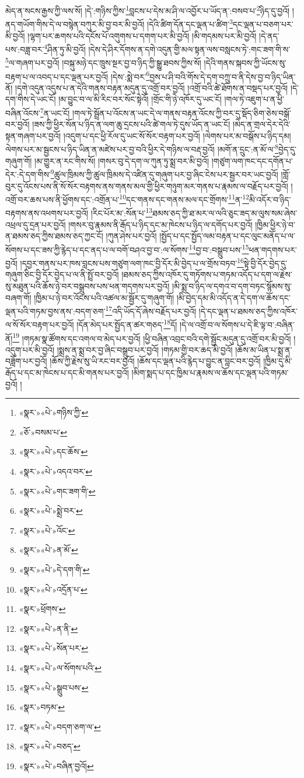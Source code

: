 མེད་ན་སངས་རྒྱས་ཀྱི་ལས་སོ། །དེ་:གཉིས་ཀྱིས་\footnote{«སྣར་»«པེ་»གཉིས་ཀྱི་}བླངས་པ་དེས་མ་ཤི་ལ་འབྱོར་པ་ཡོད་ན་:བསབ་པ་\footnote{«ཅོ་»བསམ་པ་}ཉིད་དུ་བྱའོ། །ནད་གཡོག་གིས་དེ་ལ་བསྙེན་བཀུར་མི་བྱ་བར་མི་བྱའོ། །དེའི་ཚིག་དོན་དང་ལྡན་པ་ཚིག་\footnote{«སྣར་»«པེ་»དང་ཆོས་}དང་ལྡན་པ་བཅག་པར་མི་བྱའོ། །ལྷག་པར་ཆགས་པའི་དངོས་པོ་འགུགས་པ་དགག་པར་མི་བྱའོ། །མི་གདམས་པར་མི་བྱའོ། །དེ་ནད་པས་:བཟླ་བར་\footnote{«སྣར་»«པེ་»འདའ་བར་}ཤིན་ཏུ་མི་བྱའོ། །དེས་དེ་ཤིར་དོགས་ན་དགེ་འདུན་གྱི་མལ་སྟན་ལས་བསླངས་ཏེ་:གང་ཟག་གི་ས་\footnote{«སྣར་»«པེ་»གང་ཟག་གི་}ལ་གཞག་པར་བྱའོ། །བསྐུ་མཉེ་དང་ཁྲུས་སྔར་བྱ་བ་ཉིད་ཀྱི་སྒྱུ་ཐབས་ཀྱིས་སོ། །དེའི་གནས་སྐབས་ཀྱི་ཡོངས་སུ་བརྟག་པ་ལ་འབད་པ་དང་ལྡན་པར་བྱའོ། །དེས་:སྨེ་བར་\footnote{«སྣར་»«པེ་»སྨྲེ་བར་}བྱས་པ་ཤི་བའི་གོས་དེ་དག་བཀྲུ་བ་ནི་དེས་བྱ་བ་ཉིད་ཡིན་ནོ། །དགེ་འདུན་འདུས་པ་ན་དེའི་གནས་བརྟན་མདུན་དུ་འགྲོ་བར་བྱའོ། །འགྲོ་བའི་ཚེ་ཐོགས་ན་བསྡད་པར་བྱའོ། །དེ་དག་གིས་དེ་ཡང་ངོ། །མ་བྱུང་བ་ལ་མི་རིང་བར་སོང་སྟེའོ། །གྲོང་གི་ཉེ་འཁོར་དུ་ཡང་ངོ། །གལ་ཏེ་འཇུག་པ་ན་ཕྱི་བཞིན་འོངས་\footnote{«སྣར་»«པེ་»འོང་}ན་ཡང་ངོ། །གལ་ཏེ་སྦྲོན་པ་འོངས་ན་ཡང་དེ་ལ་གནས་བརྟན་འོངས་ཀྱི་བར་དུ་སྡོད་ཅིག་ཅེས་བསྒོ་བར་བྱའོ། །ཟས་ཀྱི་ཕྱིར་སོན་པ་ཉིད་ན་ལག་ཆུ་དྲངས་པའི་ཚེ་གལ་ཏེ་དུས་ཡོད་ན་ཡང་ངོ། །མེད་ན་གྲལ་དེར་དེའི་སྟན་གཞག་པར་བྱའོ། །འདུག་པ་དང་ཕྱི་རོལ་དུ་ཡང་སོ་སོར་བརྟག་པར་བྱའོ། །ལེགས་པར་མ་བསྒོས་པ་ཉིད་དམ། ལེགས་པར་མ་སྦྱངས་པ་ཉིད་ཡིན་ན་མཛེས་པར་བྱ་བའི་ཕྱིར་དེ་གཉིས་ལ་བརྡ་བྱའོ། །མགོ་ན་དྲུང་:ན་མོ་ལ་\footnote{«སྣར་»«པེ་»ན་མོ་}བྱེད་དུ་གཞུག་གོ། །མ་གྱུར་ན་རང་གིས་སོ། །གསར་བུ་དེ་དག་ལ་ཀུན་ཏུ་སྨྲ་བར་མི་བྱའོ། །གཙུག་ལག་ཁང་དང་དགོན་པ་དེར་:དེ་དག་གིས་\footnote{«སྣར་»«པེ་»དེ་དག་གི་}ཚུལ་ཁྲིམས་ཀྱི་ཚུལ་ཁྲིམས་དེ་འཛིན་དུ་གཞུག་པར་བྱ་ཞིང་ངེས་པར་སྦྱར་བར་ཡང་བྱའོ། །གློ་བུར་དུ་འོངས་པས་ནི་སོ་སོར་བརྟགས་ནས་གནས་མལ་གྱི་ཕྱིར་གཉུག་མར་གནས་པ་རྣམས་ལ་བརྗོད་པར་བྱའོ། །འགྲོ་བར་ཆས་པས་ནི་ཕྱོགས་དང་:འགྲོན་པ་\footnote{«སྣར་»«པེ་»འདྲོན་པ་}དང་གནས་དང་གནས་མལ་དང་གྲོགས་\footnote{«སྣར་»ཕྲོགས་}ན་\footnote{«སྣར་»«པེ་»ན་ནི་}མི་འདོར་བ་ཉིད་བརྟགས་ནས་འཕགས་པར་བྱའོ། །རིང་པོར་མ་:སོན་པ་\footnote{«སྣར་»«པེ་»སོན་པར་}ཐམས་ཅད་ཀྱི་ཐ་མར་ལ་ལའི་ཅུང་ཟད་མ་ལུས་སམ་ཞེས་འཕྲལ་དུ་དྲན་པར་བྱའོ། །གསར་བུ་རྣམས་ནི་རྒོད་པ་ཉིད་དང་མ་ཁེངས་པ་ཉིད་ལ་དགོད་པར་བྱའོ། །ཁྱིམ་ཕྱིར་ཉེ་བ་ན་ཐམས་ཅད་ཀྱིས་ཐམས་ཅད་ཀྱང་ངོ། །ཀུན་ཤེས་པར་བྱའོ། །སྤྱོད་པ་དང་སྤྱོད་ལམ་བརྟན་པ་དང་ལུང་མནོད་པ་ལ་སོགས་པ་དང་ཟས་ཀྱི་རྙེད་པ་དང་ནད་པ་ལ་བགོ་བཤའ་བྱ་བ་:ལ་སོགས་\footnote{«སྣར་»«པེ་»ལ་སོགས་པའི་}བྱ་བ་:བསྒྲུབ་པས་\footnote{«སྣར་»«པེ་»སྒྲུབ་པས་}ཕན་གདགས་པར་བྱའོ། །དབྱར་གནས་པར་ཁས་བླངས་པས་གཙུག་ལག་ཁང་བྱི་དོར་མི་བྱེད་པ་ལ་གྲོས་བཏབ་\footnote{«སྣར་»བཏམ་}སྟེ་བྱི་དོར་བྱེད་དུ་གཞུག་ཅིང་བྱི་དོར་བྱེད་པ་ལ་ནི་སྤྲོ་བར་བྱའོ། །ཐམས་ཅད་ཀྱིས་འཁོར་དུ་གཏོགས་པ་གཏམ་འདོད་པ་དག་ལ་རྗེས་སུ་མཐུན་པའི་ཆོས་ཉེ་བར་བསྒྲུབས་པས་ཕན་གདགས་པར་བྱའོ། །མི་སྨྲ་བ་ཉིད་ལ་དགའ་བ་དག་བཏང་སྙོམས་སུ་བཞག་གོ། །ཁྱིམ་པ་ཉེ་བར་འོངས་པའི་འཚལ་མ་སྦྱོར་དུ་གཞུག་གོ། །མི་བྱེད་དམ་མི་འདོད་ན་དེ་དག་ལ་ཆོས་དང་ལྡན་པའི་གཏམ་བྱས་ནས་:བདག་ཅག་\footnote{«སྣར་»«པེ་»བདག་ཅག་ལ་}འདི་ཡོད་དོ་ཞེས་བརྗོད་པར་བྱའོ། །དེ་དང་ལྡན་པ་ཐམས་ཅད་ཀྱིས་འཁོར་ལ་སོ་སོར་བརྟག་པར་བྱའོ། །དོན་མེད་པར་སྤྱོད་ན་ཚར་གཅད་\footnote{«སྣར་»«པེ་»བཅད་}དོ། །དེ་ལ་འགྲོ་བ་ལ་སོགས་པ་དེ་ཇི་ལྟ་བ་:བཞིན་ནོ།\footnote{«སྣར་»«པེ་»བཞིན་བྱའོ།} །གཏམ་སྣ་ཚོགས་དང་འགལ་བ་མེད་པར་བྱའོ། །ཕྱི་བཞིན་འབྲང་བའི་དགེ་སྦྱོང་མདུན་དུ་འགྲོ་བར་མི་བྱའོ། །འདུག་པར་མི་བྱའོ། །སྨྲས་ན་སྨྲ་བར་བྱ་ཞིང་བསྒྲུབ་པར་བྱའོ། །གཏམ་གྱི་བར་ཆད་མི་བྱའོ། །ཆོས་མ་ཡིན་པ་སྨྲ་ན་བཟློག་པར་བྱའོ། །ཆོས་ཀྱི་རྗེས་སུ་ཡི་རང་བར་བྱའོ། །ཆོས་དང་ལྡན་པའི་རྙེད་པ་བྱུང་ན་བླང་བར་བྱའོ། །ཁྱིམ་དུ་མི་རྒོད་པ་དང་མ་ཁེངས་པ་དང་མི་གནས་པར་བྱའོ། །མིག་སྨད་པ་དང་ཁྱིམ་པ་རྣམས་ལ་ཆོས་དང་ལྡན་པའི་གཏམ་བྱའོ། །
